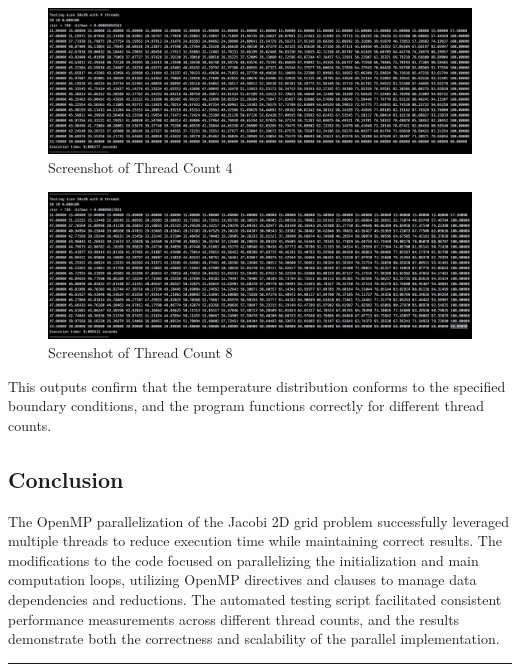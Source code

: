 \documentclass{article}
\begin{document}
\begin{figure}[H]
    \centering
    \includegraphics[width=\linewidth]{Images/Thread4.png}
    \caption{Screenshot of Thread Count 4}
    \label{fig:thread4}
\end{figure}

\begin{figure}[H]
    \centering
    \includegraphics[width=\linewidth]{Images/Thread8.png}
    \caption{Screenshot of Thread Count 8}
    \label{fig:thread8}
\end{figure}

This outputs confirm that the temperature distribution conforms to the specified boundary conditions, and the program functions correctly for different thread counts.

\subsection{Conclusion}

The OpenMP parallelization of the Jacobi 2D grid problem successfully leveraged multiple threads to reduce execution time while maintaining correct results. The modifications to the code focused on parallelizing the initialization and main computation loops, utilizing OpenMP directives and clauses to manage data dependencies and reductions. The automated testing script facilitated consistent performance measurements across different thread counts, and the results demonstrate both the correctness and scalability of the parallel implementation.

\rule{\linewidth}{0.5pt}
\newpage
\end{document}
